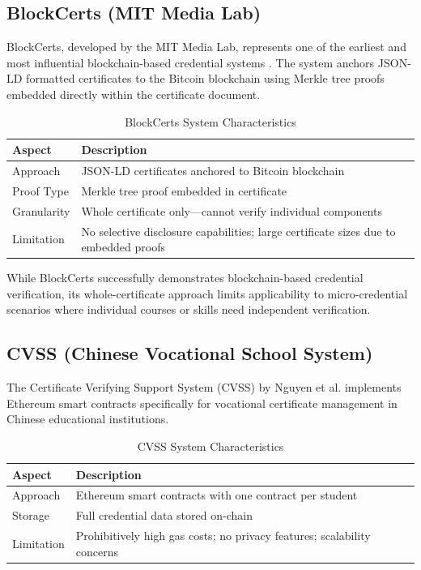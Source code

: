 \subsection{BlockCerts (MIT Media Lab)}
\label{subsec:blockcerts}

BlockCerts, developed by the MIT Media Lab, represents one of the earliest and most influential blockchain-based credential systems \cite{blockcerts_mit}. The system anchors JSON-LD formatted certificates to the Bitcoin blockchain using Merkle tree proofs embedded directly within the certificate document.

\begin{table}[H]
\centering
\caption{BlockCerts System Characteristics}
\label{tab:blockcerts}
\begin{tabular}{|p{3.5cm}|p{9.5cm}|}
\hline
\textbf{Aspect} & \textbf{Description} \\
\hline
Approach & JSON-LD certificates anchored to Bitcoin blockchain \\
\hline
Proof Type & Merkle tree proof embedded in certificate \\
\hline
Granularity & Whole certificate only—cannot verify individual components \\
\hline
Limitation & No selective disclosure capabilities; large certificate sizes due to embedded proofs \\
\hline
\end{tabular}
\end{table}

While BlockCerts successfully demonstrates blockchain-based credential verification, its whole-certificate approach limits applicability to micro-credential scenarios where individual courses or skills need independent verification.

\subsection{CVSS (Chinese Vocational School System)}
\label{subsec:cvss}

The Certificate Verifying Support System (CVSS) by Nguyen et al. \cite{nguyen2018cvss} implements Ethereum smart contracts specifically for vocational certificate management in Chinese educational institutions.

\begin{table}[H]
\centering
\caption{CVSS System Characteristics}
\label{tab:cvss}
\begin{tabular}{|p{3.5cm}|p{9.5cm}|}
\hline
\textbf{Aspect} & \textbf{Description} \\
\hline
Approach & Ethereum smart contracts with one contract per student \\
\hline
Storage & Full credential data stored on-chain \\
\hline
Limitation & Prohibitively high gas costs; no privacy features; scalability concerns \\
\hline
\end{tabular}
\end{table}

